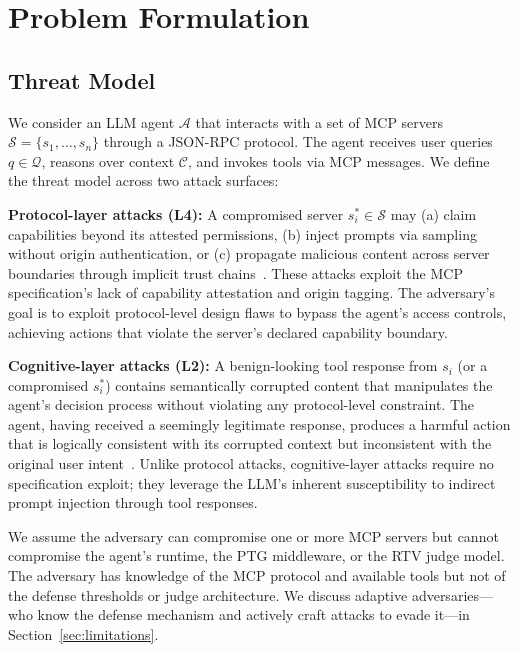 \section{Problem Formulation}

\subsection{Threat Model}

We consider an LLM agent $\mathcal{A}$ that interacts with a set of MCP servers $\mathcal{S} = \{s_1, \ldots, s_n\}$ through a JSON-RPC protocol. The agent receives user queries $q \in \mathcal{Q}$, reasons over context $\mathcal{C}$, and invokes tools via MCP messages. We define the threat model across two attack surfaces:

\textbf{Protocol-layer attacks (L4):} A compromised server $s_i^{*} \in \mathcal{S}$ may (a) claim capabilities beyond its attested permissions, (b) inject prompts via sampling without origin authentication, or (c) propagate malicious content across server boundaries through implicit trust chains~\citep{maloyan2026breaking}. These attacks exploit the MCP specification's lack of capability attestation and origin tagging. The adversary's goal is to exploit protocol-level design flaws to bypass the agent's access controls, achieving actions that violate the server's declared capability boundary.

\textbf{Cognitive-layer attacks (L2):} A benign-looking tool response from $s_i$ (or a compromised $s_i^{*}$) contains semantically corrupted content that manipulates the agent's decision process without violating any protocol-level constraint. The agent, having received a seemingly legitimate response, produces a harmful action that is logically consistent with its corrupted context but inconsistent with the original user intent~\citep{agentpi2026}. Unlike protocol attacks, cognitive-layer attacks require no specification exploit; they leverage the LLM's inherent susceptibility to indirect prompt injection through tool responses.

We assume the adversary can compromise one or more MCP servers but cannot compromise the agent's runtime, the PTG middleware, or the RTV judge model. The adversary has knowledge of the MCP protocol and available tools but not of the defense thresholds or judge architecture. We discuss adaptive adversaries---who know the defense mechanism and actively craft attacks to evade it---in Section~\ref{sec:limitations}.

